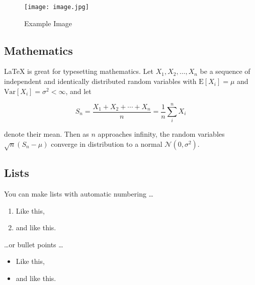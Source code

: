 \documentclass[paper=a4, fontsize=11pt,twoside]{scrartcl}
\begin{document}
\begin{figure}[h!]
\texttt{[image: image.jpg]}
\caption{\label{fig:your-figure}Example Image}
\end{figure}

\subsection*{Mathematics}

\LaTeX{} is great for typesetting mathematics. Let $X_1, X_2, \ldots, X_n$ be a sequence of independent and identically distributed random variables with $\text{E}[X_i] = \mu$ and $\text{Var}[X_i] = \sigma^2 < \infty$, and let

$$S_n = \frac{X_1 + X_2 + \cdots + X_n}{n} = \frac{1}{n}\sum_{i}^{n} X_i$$

denote their mean. Then as $n$ approaches infinity, the random variables $\sqrt{n}(S_n - \mu)$ converge in distribution to a normal $\mathcal{N}(0, \sigma^2)$.

\subsection*{Lists}

You can make lists with automatic numbering \dots

\begin{enumerate}
	\item Like this,
	\item and like this.
\end{enumerate}

\dots or bullet points \dots

\begin{itemize}
	\item Like this,
	\item and like this.
\end{itemize}
\end{document}
